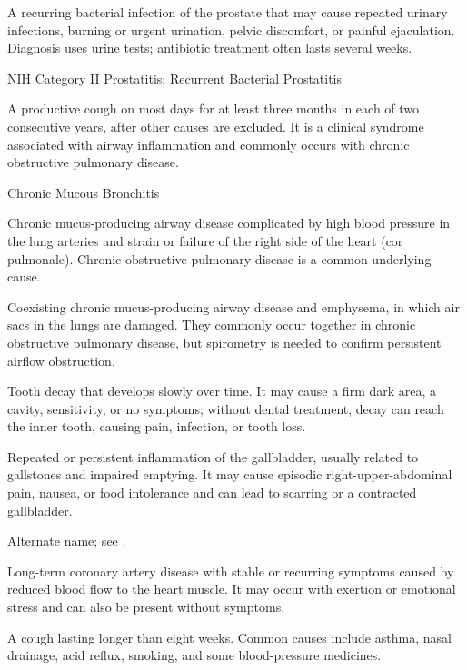  A recurring bacterial infection of the prostate that may cause repeated urinary infections, burning or urgent urination, pelvic discomfort, or painful ejaculation. Diagnosis uses urine tests; antibiotic treatment often lasts several weeks.

\synonyms
NIH Category II Prostatitis; Recurrent Bacterial Prostatitis

 A productive cough on most days for at least
three months in each of two consecutive years, after other causes are excluded.
It is a clinical syndrome associated with airway inflammation and commonly
occurs with chronic obstructive pulmonary disease.

\synonyms
Chronic Mucous Bronchitis

 Chronic mucus-producing airway disease complicated by high blood pressure in the lung arteries and strain or failure of the right side of the heart (cor pulmonale). Chronic obstructive pulmonary disease is a common underlying cause.

 Coexisting chronic mucus-producing airway disease and emphysema, in which air sacs in the lungs are damaged. They commonly occur together in chronic obstructive pulmonary disease, but spirometry is needed to confirm persistent airflow obstruction.

 Tooth decay that develops slowly over time. It may cause a firm dark area, a cavity, sensitivity, or no symptoms; without dental treatment, decay can reach the inner tooth, causing pain, infection, or tooth loss.

 Repeated or persistent inflammation of the gallbladder, usually related to gallstones and impaired emptying. It may cause episodic right-upper-abdominal pain, nausea, or food intolerance and can lead to scarring or a contracted gallbladder.

 Alternate name; see .

 Long-term coronary artery disease with stable or recurring symptoms caused by reduced blood flow to the heart muscle. It may occur with exertion or emotional stress and can also be present without symptoms.

 A cough lasting longer than eight weeks. Common causes include asthma, nasal drainage, acid reflux, smoking, and some blood-pressure medicines.

